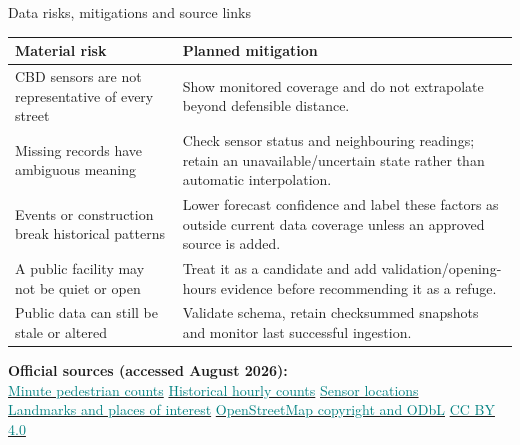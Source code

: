 \documentclass[aspectratio=169,11pt]{beamer}
\newcommand{\source}[2]{\href{#1}{\textcolor{teal}{#2}}}
\begin{document}
\begin{frame}{Data risks, mitigations and source links}
  \small
  \begin{tabularx}{\textwidth}{p{3.2cm}X}
    \toprule
    \textbf{Material risk} & \textbf{Planned mitigation} \\
    \midrule
    CBD sensors are not representative of every street &
    Show monitored coverage and do not extrapolate beyond defensible distance. \\
    Missing records have ambiguous meaning &
    Check sensor status and neighbouring readings; retain an
    unavailable/uncertain state rather than automatic interpolation. \\
    Events or construction break historical patterns &
    Lower forecast confidence and label these factors as outside current data
    coverage unless an approved source is added. \\
    A public facility may not be quiet or open &
    Treat it as a candidate and add validation/opening-hours evidence before
    recommending it as a refuge. \\
    Public data can still be stale or altered &
    Validate schema, retain checksummed snapshots and monitor last successful
    ingestion. \\
    \bottomrule
  \end{tabularx}

  \vspace{0.35em}
  \tiny
  \textbf{Official sources (accessed August 2026):}\\
  \source{https://data.melbourne.vic.gov.au/explore/dataset/pedestrian-counting-system-past-hour-counts-per-minute/}{Minute pedestrian counts}
  \quad
  \source{https://data.melbourne.vic.gov.au/explore/dataset/pedestrian-counting-system-monthly-counts-per-hour/}{Historical hourly counts}
  \quad
  \source{https://data.melbourne.vic.gov.au/explore/dataset/pedestrian-counting-system-sensor-locations/}{Sensor locations}\\
  \source{https://data.melbourne.vic.gov.au/explore/dataset/landmarks-and-places-of-interest-including-schools-theatres-health-services-spor/}{Landmarks and places of interest}
  \quad
  \source{https://www.openstreetmap.org/copyright}{OpenStreetMap copyright and ODbL}
  \quad
  \source{https://creativecommons.org/licenses/by/4.0/}{CC BY 4.0}

\end{frame}
\end{document}
